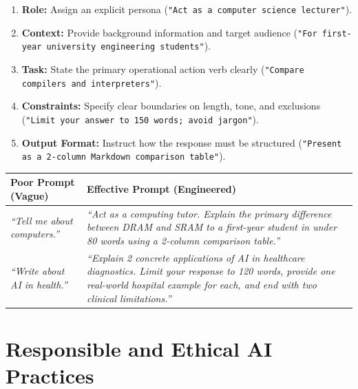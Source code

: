 \begin{definition}
\begin{enumerate}[leftmargin=1.2em]
    \item \textbf{Role:} Assign an explicit persona (\texttt{"Act as a computer science lecturer"}).
    \item \textbf{Context:} Provide background information and target audience (\texttt{"For first-year university engineering students"}).
    \item \textbf{Task:} State the primary operational action verb clearly (\texttt{"Compare compilers and interpreters"}).
    \item \textbf{Constraints:} Specify clear boundaries on length, tone, and exclusions (\texttt{"Limit your answer to 150 words; avoid jargon"}).
    \item \textbf{Output Format:} Instruct how the response must be structured (\texttt{"Present as a 2-column Markdown comparison table"}).
\end{enumerate}
\end{definition}

\begin{center}
\small
\renewcommand{\arraystretch}{1.2}
\begin{tabularx}{\textwidth}{p{4.5cm} X}
\toprule
\textbf{Poor Prompt (Vague)} & \textbf{Effective Prompt (Engineered)} \\
\midrule
\textit{``Tell me about computers.''} & \textit{``Act as a computing tutor. Explain the primary difference between DRAM and SRAM to a first-year student in under 80 words using a 2-column comparison table.''} \\
\midrule
\textit{``Write about AI in health.''} & \textit{``Explain 2 concrete applications of AI in healthcare diagnostics. Limit your response to 120 words, provide one real-world hospital example for each, and end with two clinical limitations.''} \\
\bottomrule
\end{tabularx}
\end{center}

\section{Responsible and Ethical AI Practices}

